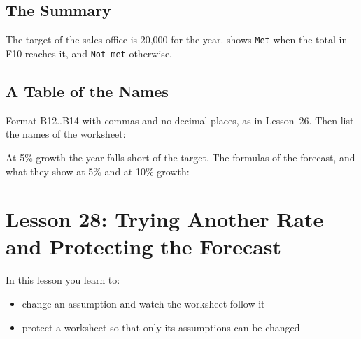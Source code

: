 \subsection{The Summary}
\begin{Keystrokes}
\end{Keystrokes}
The target of the sales office is 20,000 for the year.   shows
\texttt{Met} when the total in F10 reaches it, and \texttt{Not met}
otherwise.

\subsection{A Table of the Names}
Format B12..B14 with commas and no decimal places, as in Lesson~26.  Then
list the names of the worksheet:

\begin{Keystrokes}
\end{Keystrokes}

At 5\% growth the year falls short of the target.  The formulas of the
forecast, and what they show at 5\% and at 10\% growth:


\section{Lesson 28: Trying Another Rate and Protecting the Forecast}
In this lesson you learn to:
\begin{itemize}
\item change an assumption and watch the worksheet follow it
\item protect a worksheet so that only its assumptions can be changed
\end{itemize}

